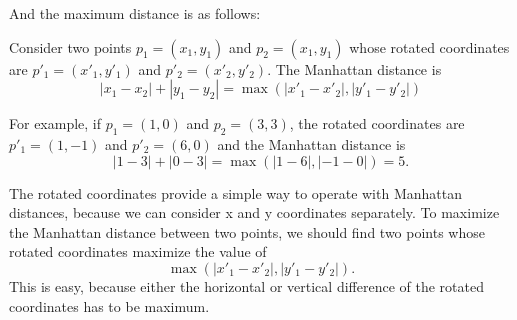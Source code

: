 And the maximum distance is as follows:
\begin{center}
\end{center}

Consider two points $p_1=(x_1,y_1)$ and $p_2=(x_1,y_1)$ whose rotated
coordinates are $p'_1=(x'_1,y'_1)$ and $p'_2=(x'_2,y'_2)$.
The Manhattan distance is
\[|x_1-x_2|+|y_1-y_2| = \max(|x'_1-x'_2|,|y'_1-y'_2|)\]

For example, if $p_1=(1,0)$ and $p_2=(3,3)$,
the rotated coordinates are $p'_1=(1,-1)$ and $p'_2=(6,0)$
and the Manhattan distance is
\[|1-3|+|0-3| = \max(|1-6|,|-1-0|) = 5.\]

The rotated coordinates provide a simple way
to operate with Manhattan distances, because we can
consider x and y coordinates separately.
To maximize the Manhattan distance between two points,
we should find two points whose
rotated coordinates maximize the value of
\[\max(|x'_1-x'_2|,|y'_1-y'_2|).\]
This is easy, because either the horizontal or vertical
difference of the rotated coordinates has to be maximum.